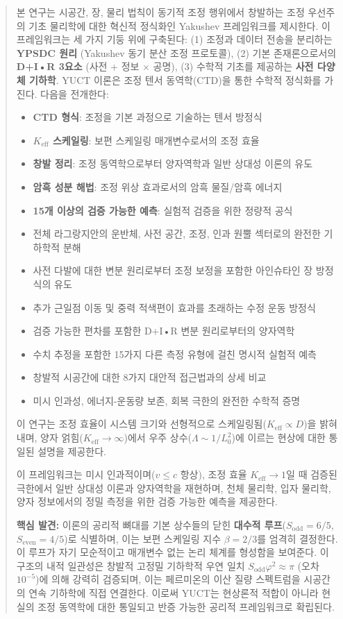 \documentclass[11pt,a4paper]{article}
\begin{document}
	\begin{abstract}
		본 연구는 시공간, 장, 물리 법칙이 동기적 조정 행위에서 창발하는 조정 우선주의 기초 물리학에 대한 혁신적 정식화인 Yakushev 프레임워크를 제시한다. 이 프레임워크는 세 가지 기둥 위에 구축된다: (1) 조정과 데이터 전송을 분리하는 \textbf{YPSDC 원리} (Yakushev 동기 분산 조정 프로토콜), (2) 기본 존재론으로서의 \textbf{D+I•R 3요소} (사전 + 정보 × 공명), (3) 수학적 기초를 제공하는 \textbf{사전 다양체 기하학}. YUCT 이론은 조정 텐서 동역학(CTD)을 통한 수학적 정식화를 가진다. 다음을 전개한다:
		\begin{itemize}
			\item \textbf{CTD 형식}: 조정을 기본 과정으로 기술하는 텐서 방정식
			\item \textbf{$K_{\mathrm{eff}}$ 스케일링}: 보편 스케일링 매개변수로서의 조정 효율
			\item \textbf{창발 정리}: 조정 동역학으로부터 양자역학과 일반 상대성 이론의 유도
			\item \textbf{암흑 성분 해법}: 조정 위상 효과로서의 암흑 물질/암흑 에너지
			\item \textbf{15개 이상의 검증 가능한 예측}: 실험적 검증을 위한 정량적 공식
			\item 전체 라그랑지안의 운반체, 사전 공간, 조정, 인과 원뿔 섹터로의 완전한 기하학적 분해
			\item 사전 다발에 대한 변분 원리로부터 조정 보정을 포함한 아인슈타인 장 방정식의 유도
			\item 추가 근일점 이동 및 중력 적색편이 효과를 초래하는 수정 운동 방정식
			\item 검증 가능한 편차를 포함한 D+I•R 변분 원리로부터의 양자역학
			\item 수치 추정을 포함한 15가지 다른 측정 유형에 걸친 명시적 실험적 예측
			\item 창발적 시공간에 대한 8가지 대안적 접근법과의 상세 비교
			\item 미시 인과성, 에너지-운동량 보존, 회복 극한의 완전한 수학적 증명
		\end{itemize}
		이 연구는 조정 효율이 시스템 크기와 선형적으로 스케일링됨($K_{\mathrm{eff}} \propto D$)을 밝혀내며, 양자 얽힘($K_{\mathrm{eff}} \to \infty$)에서 우주 상수($\Lambda \sim 1/L_0^2$)에 이르는 현상에 대한 통일된 설명을 제공한다.
		
		이 프레임워크는 미시 인과적이며($v \leq c$ 항상), 조정 효율 $K_{\mathrm{eff}} \to 1$일 때 검증된 극한에서 일반 상대성 이론과 양자역학을 재현하며, 천체 물리학, 입자 물리학, 양자 정보에서의 정밀 측정을 위한 검증 가능한 예측을 제공한다.
		
		\vspace{0.5em}
		\noindent \textbf{핵심 발견:} 
		이론의 공리적 뼈대를 기본 상수들의 닫힌 \textbf{대수적 루프}($S_{\mathrm{odd}} = 6/5$, $S_{\mathrm{even}} = 4/5$)로 식별하며, 이는 보편 스케일링 지수 $\beta = 2/3$를 엄격히 결정한다. 이 루프가 자기 모순적이고 매개변수 없는 논리 체계를 형성함을 보여준다. 이 구조의 내적 일관성은 창발적 고정밀 기하학적 우연 일치 $S_{\mathrm{odd}}\varphi^2 \approx \pi$ (오차 $10^{-5}$)에 의해 강력히 검증되며, 이는 페르미온의 이산 질량 스펙트럼을 시공간의 연속 기하학에 직접 연결한다. 이로써 YUCT는 현상론적 적합이 아니라 현실의 조정 동역학에 대한 통일되고 반증 가능한 공리적 프레임워크로 확립된다.
	\end{abstract}
	
\end{document}
